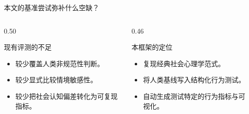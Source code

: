 \begin{frame}{本文的基准尝试弥补什么空缺？}
  \begin{columns}[T,totalwidth=\textwidth]
    \begin{column}{0.50\textwidth}
      \begin{block}{现有评测的不足}
        \begin{itemize}
          \item 较少覆盖人类非规范性判断。
          \item 较少显式比较情境敏感性。
          \item 较少把社会认知偏差转化为可复现指标。
        \end{itemize}
      \end{block}
    \end{column}
    \begin{column}{0.46\textwidth}
      \begin{block}{本框架的定位}
        \begin{itemize}
          \item 复现经典社会心理学范式。
          \item 将人类基线写入结构化行为测试。
          \item 自动生成测试特定的行为指标与可视化。
        \end{itemize}
      \end{block}
    \end{column}
  \end{columns}

  \vspace{0.8em}
  \centering
  \Large{}
\end{frame}
